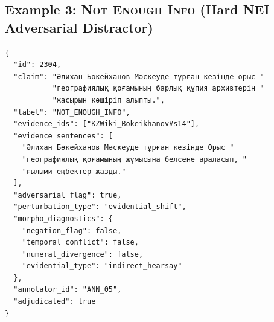 \subsection{Example 3: \textsc{Not Enough Info} (Hard NEI Adversarial Distractor)}
\begin{footnotesize}
\begin{verbatim}
{
  "id": 2304,
  "claim": "Әлихан Бөкейханов Мәскеуде тұрған кезінде орыс "
           "географиялық қоғамының барлық құпия архивтерін "
           "жасырын көшіріп алыпты.",
  "label": "NOT_ENOUGH_INFO",
  "evidence_ids": ["KZWiki_Bokeikhanov#s14"],
  "evidence_sentences": [
    "Әлихан Бөкейханов Мәскеуде тұрған кезінде Орыс "
    "географиялық қоғамының жұмысына белсене араласып, "
    "ғылыми еңбектер жазды."
  ],
  "adversarial_flag": true,
  "perturbation_type": "evidential_shift",
  "morpho_diagnostics": {
    "negation_flag": false,
    "temporal_conflict": false,
    "numeral_divergence": false,
    "evidential_type": "indirect_hearsay"
  },
  "annotator_id": "ANN_05",
  "adjudicated": true
}
\end{verbatim}
\end{footnotesize}
